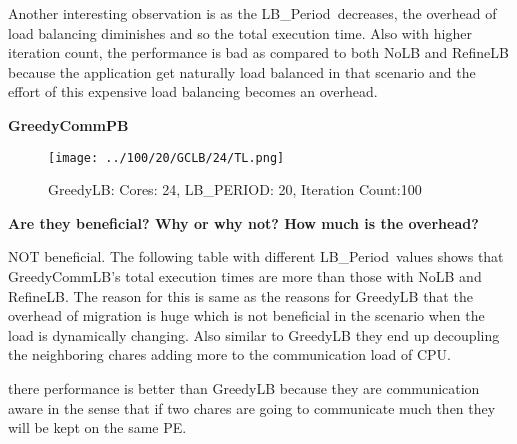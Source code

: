 \documentclass[10pt,times]{report}
\newcommand{\lbp}{LB\_Period}
\begin{document}
Another interesting observation is as the \lbp\ decreases, the overhead of load
balancing diminishes and so the total execution time.      Also with higher
iteration count, the performance is bad as compared to both NoLB and RefineLB
because the application get naturally load balanced in that scenario and the
effort of this expensive load balancing becomes an overhead.

\pagebreak

\begin{flushleft}
\textbf{\Large{GreedyCommPB}}
\end{flushleft}

  \begin{figure}[htbp]
    \begin{center}
       \texttt{[image: ../100/20/GCLB/24/TL.png]} 
    \end{center}
    \caption{GreedyLB: Cores: 24, LB\_PERIOD: 20, Iteration Count:100}
      \label{fig:3} 
  \end{figure}

  \begin{flushleft}
    \textbf{Are   they   beneficial?   Why   or   why   not?   How   much   is   the   overhead?}  
  \end{flushleft}
  NOT beneficial. The following table with different \lbp\ values shows that GreedyCommLB's total execution times are  more than those with NoLB and RefineLB.
  The reason for this is same as the reasons for GreedyLB that the overhead of migration is huge which is not beneficial in
  the scenario when the load is dynamically changing. Also similar to GreedyLB they end up decoupling the neighboring
  chares adding more to the communication load of CPU.
  
   there performance is better than
  GreedyLB because they are communication aware in the sense that if two chares are going to communicate much then they will be kept on the same PE.
\end{document}
